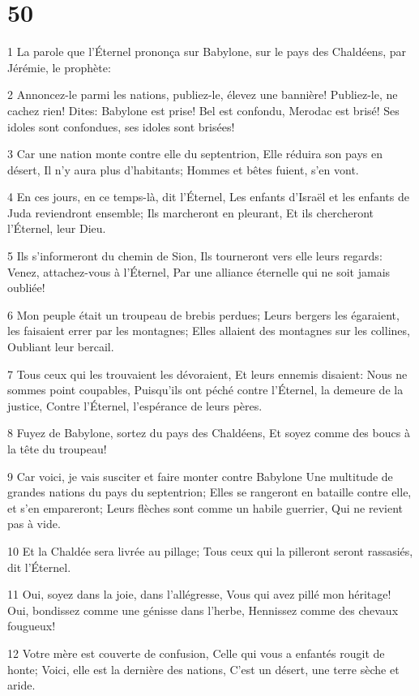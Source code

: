 \chapter{50}

\par 1 La parole que l'Éternel prononça sur Babylone, sur le pays des Chaldéens, par Jérémie, le prophète:
\par 2 Annoncez-le parmi les nations, publiez-le, élevez une bannière! Publiez-le, ne cachez rien! Dites: Babylone est prise! Bel est confondu, Merodac est brisé! Ses idoles sont confondues, ses idoles sont brisées!
\par 3 Car une nation monte contre elle du septentrion, Elle réduira son pays en désert, Il n'y aura plus d'habitants; Hommes et bêtes fuient, s'en vont.
\par 4 En ces jours, en ce temps-là, dit l'Éternel, Les enfants d'Israël et les enfants de Juda reviendront ensemble; Ils marcheront en pleurant, Et ils chercheront l'Éternel, leur Dieu.
\par 5 Ils s'informeront du chemin de Sion, Ils tourneront vers elle leurs regards: Venez, attachez-vous à l'Éternel, Par une alliance éternelle qui ne soit jamais oubliée!
\par 6 Mon peuple était un troupeau de brebis perdues; Leurs bergers les égaraient, les faisaient errer par les montagnes; Elles allaient des montagnes sur les collines, Oubliant leur bercail.
\par 7 Tous ceux qui les trouvaient les dévoraient, Et leurs ennemis disaient: Nous ne sommes point coupables, Puisqu'ils ont péché contre l'Éternel, la demeure de la justice, Contre l'Éternel, l'espérance de leurs pères.
\par 8 Fuyez de Babylone, sortez du pays des Chaldéens, Et soyez comme des boucs à la tête du troupeau!
\par 9 Car voici, je vais susciter et faire monter contre Babylone Une multitude de grandes nations du pays du septentrion; Elles se rangeront en bataille contre elle, et s'en empareront; Leurs flèches sont comme un habile guerrier, Qui ne revient pas à vide.
\par 10 Et la Chaldée sera livrée au pillage; Tous ceux qui la pilleront seront rassasiés, dit l'Éternel.
\par 11 Oui, soyez dans la joie, dans l'allégresse, Vous qui avez pillé mon héritage! Oui, bondissez comme une génisse dans l'herbe, Hennissez comme des chevaux fougueux!
\par 12 Votre mère est couverte de confusion, Celle qui vous a enfantés rougit de honte; Voici, elle est la dernière des nations, C'est un désert, une terre sèche et aride.
